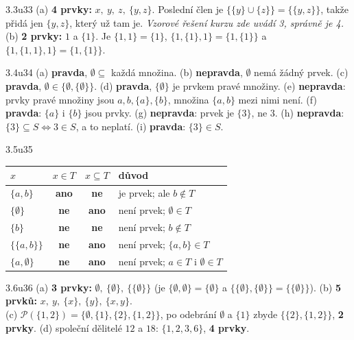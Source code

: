 \documentclass[10pt,a4paper]{article}
\newcommand{\Ano}{\textcolor{good}{\sffamily\bfseries ano}\xspace}
\newcommand{\Ne}{\textcolor{warn}{\sffamily\bfseries ne}\xspace}
\newcommand{\pravda}{\textcolor{good}{\sffamily\bfseries pravda}\xspace}
\newcommand{\nepravda}{\textcolor{warn}{\sffamily\bfseries nepravda}\xspace}
\begin{document}
\begin{reseni}{3.3}{u33}
(a) \textbf{4 prvky:} $x,\ y,\ z,\ \{y,z\}$. Poslední člen je $\{\{y\}\cup\{z\}\}=\{\{y,z\}\}$, takže přidá jen $\{y,z\}$, který už tam je. \emph{Vzorové řešení kurzu zde uvádí 3, správně je 4.}\\
(b) \textbf{2 prvky:} $1$ a $\{1\}$. Je $\{1,1\}=\{1\}$, $\{1,\{1\},1\}=\{1,\{1\}\}$ a $\{1,\{1,1\},1\}=\{1,\{1\}\}$.
\end{reseni}

\begin{reseni}{3.4}{u34}
(a) \pravda, $\emptyset\subseteq$ každá množina. (b) \nepravda, $\emptyset$ nemá žádný prvek. (c) \pravda, $\emptyset\in\{\emptyset,\{\emptyset\}\}$. (d) \pravda, $\{\emptyset\}$ je prvkem pravé množiny. (e) \nepravda: prvky pravé množiny jsou $a,b,\{a\},\{b\}$, množina $\{a,b\}$ mezi nimi není. (f) \pravda: $\{a\}$ i $\{b\}$ jsou prvky. (g) \nepravda: prvek je $\{3\}$, ne $3$. (h) \nepravda: $\{3\}\subseteq S\iff 3\in S$, a to neplatí. (i) \pravda: $\{3\}\in S$.
\end{reseni}

\begin{reseni}{3.5}{u35}
\begin{center}\small
\begin{tabular}{@{}lccl@{}}
$x$ & $x\in T$ & $x\subseteq T$ & důvod\\\hline
$\{a,b\}$ & \Ano & \Ne & je prvek; ale $b\notin T$\\
$\{\emptyset\}$ & \Ne & \Ano & není prvek; $\emptyset\in T$\\
$\{b\}$ & \Ne & \Ne & není prvek; $b\notin T$\\
$\{\{a,b\}\}$ & \Ne & \Ano & není prvek; $\{a,b\}\in T$\\
$\{a,\emptyset\}$ & \Ne & \Ano & není prvek; $a\in T$ i $\emptyset\in T$
\end{tabular}
\end{center}
\end{reseni}

\begin{reseni}{3.6}{u36}
(a) \textbf{3 prvky:} $\emptyset,\ \{\emptyset\},\ \{\{\emptyset\}\}$ (je $\{\emptyset,\emptyset\}=\{\emptyset\}$ a $\{\{\emptyset\},\{\emptyset\}\}=\{\{\emptyset\}\}$).\quad
(b) \textbf{5 prvků:} $x,\ y,\ \{x\},\ \{y\},\ \{x,y\}$.\\
(c) $\mathcal P(\{1,2\})=\{\emptyset,\{1\},\{2\},\{1,2\}\}$, po odebrání $\emptyset$ a $\{1\}$ zbyde $\{\{2\},\{1,2\}\}$, \textbf{2 prvky}.\quad
(d) společní dělitelé $12$ a $18$: $\{1,2,3,6\}$, \textbf{4 prvky}.
\end{reseni}
\end{document}
